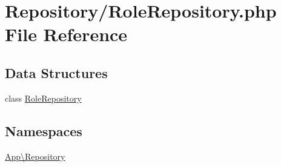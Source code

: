 \hypertarget{_role_repository_8php}{}\section{Repository/\+Role\+Repository.php File Reference}
\label{_role_repository_8php}
\subsection*{Data Structures}
\begin{DoxyCompactItemize}
\item 
class \mbox{\hyperlink{class_app_1_1_repository_1_1_role_repository}{Role\+Repository}}
\end{DoxyCompactItemize}
\subsection*{Namespaces}
\begin{DoxyCompactItemize}
\item 
 \mbox{\hyperlink{namespace_app_1_1_repository}{App\textbackslash{}\+Repository}}
\end{DoxyCompactItemize}

